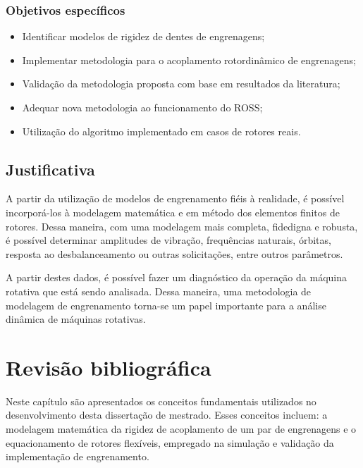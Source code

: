 \subsubsection{Objetivos específicos}

\begin{itemize}
	\item Identificar modelos de rigidez de dentes de engrenagens;
	\item Implementar metodologia para o acoplamento rotordinâmico de engrenagens;
	\item Validação da metodologia proposta com base em resultados da literatura;
	\item Adequar nova metodologia ao funcionamento do ROSS;
	\item Utilização do algoritmo implementado em casos de rotores reais.
\end{itemize}

\subsection{Justificativa}

A partir da utilização de modelos de engrenamento fiéis à realidade, é possível incorporá-los à modelagem matemática e em método dos elementos finitos de rotores. Dessa maneira, com uma modelagem mais completa, fidedigna e robusta, é possível determinar amplitudes de vibração, frequências naturais, órbitas, resposta ao desbalanceamento ou outras solicitações, entre outros parâmetros. 

A partir destes dados, é possível fazer um diagnóstico da operação da máquina rotativa que está sendo analisada. Dessa maneira, uma metodologia de modelagem de engrenamento torna-se um papel importante para a análise dinâmica de máquinas rotativas.


\newpage
\section{Revisão bibliográfica}

Neste capítulo são apresentados os conceitos fundamentais utilizados no desenvolvimento desta dissertação de mestrado. Esses conceitos incluem: a modelagem matemática da rigidez de acoplamento de um par de engrenagens e o equacionamento de rotores flexíveis, empregado na simulação e validação da implementação de engrenamento.


